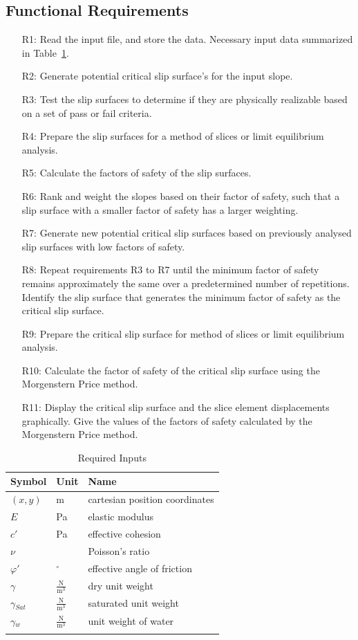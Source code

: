 \documentclass[12pt]{article}
\begin{document}
\subsection{Functional Requirements}
\label{Sec:FuncRequ}
\begin{itemize}
\item[R1:]Read the input file, and store the data. Necessary input data summarized in Table~\ref{Table:RequInpu}.
\item[R2:]Generate potential critical slip surface's for the input slope.
\item[R3:]Test the slip surfaces to determine if they are physically realizable based on a set of pass or fail criteria.
\item[R4:]Prepare the slip surfaces for a method of slices or limit equilibrium analysis.
\item[R5:]Calculate the factors of safety of the slip surfaces.
\item[R6:]Rank and weight the slopes based on their factor of safety, such that a slip surface with a smaller factor of safety has a larger weighting.
\item[R7:]Generate new potential critical slip surfaces based on previously analysed slip surfaces with low factors of safety.
\item[R8:]Repeat requirements R3 to R7 until the minimum factor of safety remains approximately the same over a predetermined number of repetitions. Identify the slip surface that generates the minimum factor of safety as the critical slip surface.
\item[R9:]Prepare the critical slip surface for method of slices or limit equilibrium analysis.
\item[R10:]Calculate the factor of safety of the critical slip surface using the Morgenstern Price method.
\item[R11:]Display the critical slip surface and the slice element displacements graphically. Give the values of the factors of safety calculated by the Morgenstern Price method.
\end{itemize}
\begin{longtable}{l l l}
\toprule
Symbol & Unit & Name
\\
\midrule
$(x,y)$ & m & cartesian position coordinates
\\
$E$ & Pa & elastic modulus
\\
$c'$ & Pa & effective cohesion
\\
$\nu{}$ &  & Poisson's ratio
\\
$\varphi{}'$ & ${}^{\circ}$ & effective angle of friction
\\
$\gamma{}$ & $\frac{\text{N}}{\text{m}^{3}}$ & dry unit weight
\\
$\gamma{}_{Sat}$ & $\frac{\text{N}}{\text{m}^{3}}$ & saturated unit weight
\\
$\gamma{}_{w}$ & $\frac{\text{N}}{\text{m}^{3}}$ & unit weight of water
\\
\bottomrule
\caption{Required Inputs}
\label{Table:RequInpu}
\end{longtable}
\end{document}
